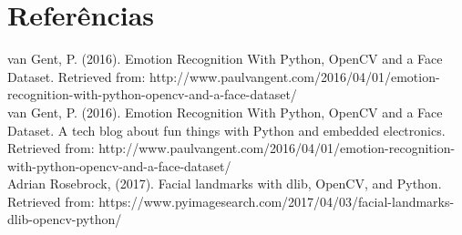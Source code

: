 \documentclass[a4paper, 12pt]{article}
\begin{document}
\clearpage
\newpage
\section{Referências}

van Gent, P. (2016). Emotion Recognition With Python, OpenCV and a Face Dataset. Retrieved from: http://www.paulvangent.com/2016/04/01/emotion-recognition-with-python-opencv-and-a-face-dataset/ \\

van Gent, P. (2016). Emotion Recognition With Python, OpenCV and a Face Dataset. A tech blog about fun things with Python and embedded electronics. Retrieved from:
http://www.paulvangent.com/2016/04/01/emotion-recognition-with-python-opencv-and-a-face-dataset/ \\

Adrian Rosebrock, (2017). Facial landmarks with dlib, OpenCV, and Python. Retrieved from: https://www.pyimagesearch.com/2017/04/03/facial-landmarks-dlib-opencv-python/
\end{document}
